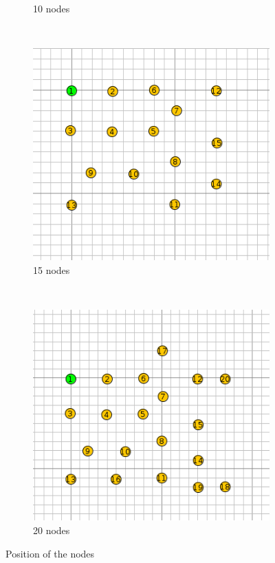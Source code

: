 \begin{figure}[h]
\begin{subfigure}[b]{0.45\textwidth}
        \caption{10 nodes}
    \end{subfigure}
    ~
    \begin{subfigure}[b]{0.45\textwidth}
        \includegraphics[width=\textwidth]{res/15_nodes}
        \caption{15 nodes}
    \end{subfigure}
    ~
    \begin{subfigure}[b]{0.45\textwidth}
        \includegraphics[width=\textwidth]{res/20_nodes}
        \caption{20 nodes}
    \end{subfigure}
    \caption{Position of the nodes}
    \label{fig:nodes_position}
\end{figure}

